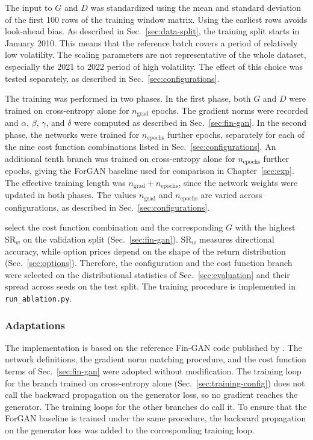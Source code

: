 The input to $G$ and $D$ was standardized using the mean and standard deviation of the first \num{100} rows of the training window matrix. Using the earliest rows avoids look-ahead bias. As described in Sec.~\ref{sec:data-split}, the training split starts in January 2010. This means that the reference batch covers a period of relatively low volatility. The scaling parameters are not representative of the whole dataset, especially the 2021 to 2022 period of high volatility. The effect of this choice was tested separately, as described in Sec.~\ref{sec:configurations}.

The training was performed in two phases. In the first phase, both $G$ and $D$ were trained on cross-entropy alone for $n_{\text{grad}}$ epochs. The gradient norms were recorded and $\alpha$, $\beta$, $\gamma$, and $\delta$ were computed as described in Sec.~\ref{sec:fin-gan}. In the second phase, the networks were trained for $n_{\text{epochs}}$ further epochs, separately for each of the nine cost function combinations listed in Sec.~\ref{sec:configurations}. An additional tenth branch was trained on cross-entropy alone for $n_{\text{epochs}}$ further epochs, giving the ForGAN baseline used for comparison in Chapter~\ref{sec:exp}. The effective training length was $n_{\text{grad}} + n_{\text{epochs}}$, since the network weights were updated in both phases. The values $n_{\text{grad}}$ and $n_{\text{epochs}}$ are varied across configurations, as described in Sec.~\ref{sec:configurations}.

\textcite{vuleticFinGANForecastingClassifying2024} select the cost function combination and the corresponding $G$ with the highest $\mathrm{SR}_{w}$ on the validation split (Sec.~\ref{sec:fin-gan}). $\mathrm{SR}_{w}$ measures directional accuracy, while option prices depend on the shape of the return distribution (Sec.~\ref{sec:options}). Therefore, the configuration and the cost function branch were selected on the distributional statistics of Sec.~\ref{sec:evaluation} and their spread across seeds on the test split. The training procedure is implemented in \texttt{run\_ablation.py}.

\subsubsection{Adaptations}\label{sec:adaptations}
The implementation is based on the reference Fin-GAN code published by \textcite{vuleticFinGANForecastingClassifying2024}. The network definitions, the gradient norm matching procedure, and the cost function terms of Sec.~\ref{sec:fin-gan} were adopted without modification. The training loop for the branch trained on cross-entropy alone (Sec.~\ref{sec:training-config}) does not call the backward propagation on the generator loss, so no gradient reaches the generator. The training loops for the other branches do call it. To ensure that the ForGAN baseline is trained under the same procedure, the backward propagation on the generator loss was added to the corresponding training loop.


